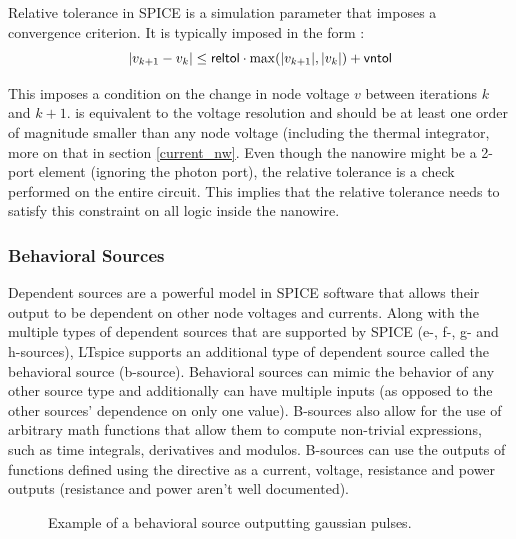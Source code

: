 
Relative tolerance in SPICE is a simulation parameter that imposes a convergence criterion.
It is typically imposed in the form \cite{accurate_sim_in_spice_kundert}:
$$|v_{k+1} - v_k| \leq \textnormal{\textsf{reltol}} \cdot \max(|v_{k+1}|, |v_k|) + \textnormal{\textsf{vntol}}$$

This imposes a condition on the change in node voltage $v$ between iterations $k$ and $k+1$.
 is equivalent to the voltage resolution and should be at least one order of magnitude
smaller than any node voltage (including the thermal integrator, more on that in section
\ref{current_nw}. Even though the nanowire might be a 2-port element (ignoring the photon port),
the relative tolerance is a check performed on the entire circuit. This implies that the relative
tolerance needs to satisfy this constraint on all logic inside the nanowire.

\subsubsection{Behavioral Sources}

Dependent sources are a powerful model in SPICE software that allows their output to be
dependent on other node voltages and currents. Along with the multiple types
of dependent sources that are supported by SPICE (e-, f-, g- and h-sources), LTspice
supports an additional type of dependent source called the behavioral source (b-source).
Behavioral sources can mimic the behavior of any other source type and additionally
can have multiple inputs (as opposed to the other sources' dependence on only one value).
B-sources also allow for the use of arbitrary math functions that allow them to compute
non-trivial expressions, such as time integrals, derivatives and modulos.
B-sources can use the outputs of functions defined using the  directive
as a current, voltage, resistance and power outputs (resistance and power aren't well 
documented). 

\begin{figure}
    \centering
    \caption{Example of a behavioral source outputting gaussian pulses.}
\end{figure}

